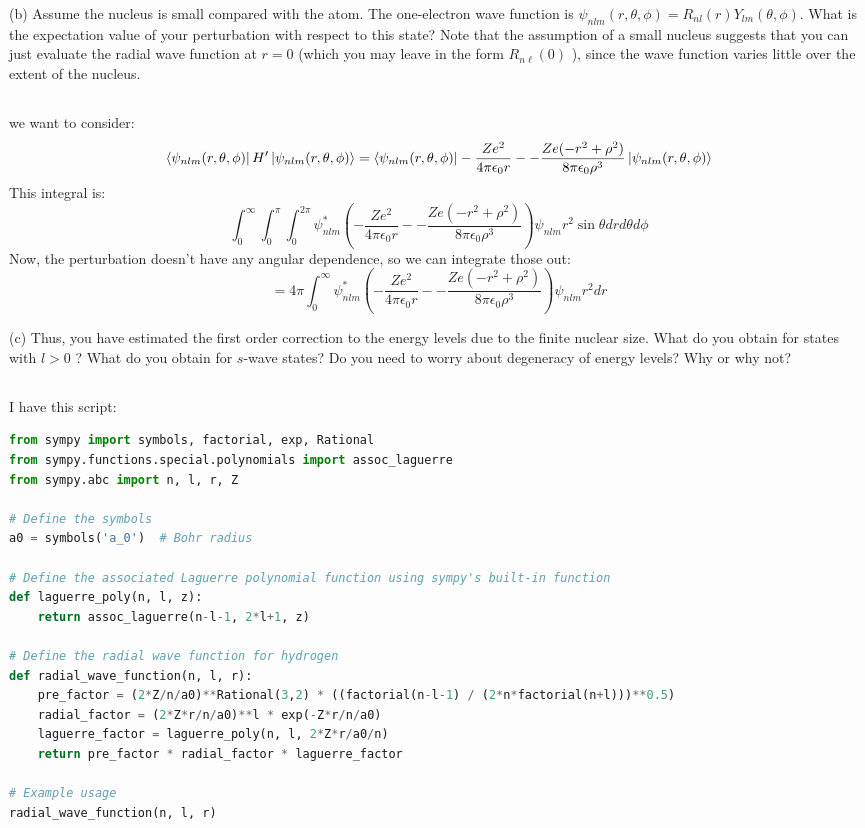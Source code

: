\documentclass[12pt]{article}
\begin{document}
(b) Assume the nucleus is small compared with the atom. The one-electron wave function is $\psi_{n l m}(r, \theta, \phi)=R_{n l}(r) Y_{l m}(\theta, \phi)$. What is the expectation value of your perturbation with respect to this state? Note that the assumption of a small nucleus suggests that you can just evaluate the radial wave function at $r=0$ (which you may leave in the form $R_{n \ell}(0)$ ), since the wave function varies little over the extent of the nucleus.
\subsection{}
we want to consider:
\begin{equation}
  \bra{\psi_{n l m}(r, \theta, \phi)}H'\ket{\psi_{n l m}(r, \theta, \phi)} = \bra{\psi_{n l m}(r, \theta, \phi)}-\frac{Ze^2}{4\pi\epsilon_0 r} - -\frac{Ze(-r^2 + \rho^2)}{8\pi\epsilon_0\rho^3}\ket{\psi_{n l m}(r, \theta, \phi)}
\end{equation}
This integral is:
\begin{equation}
  \int_{0}^{\infty} \int_{0}^{\pi} \int_{0}^{2 \pi} \psi_{n l m}^{*}(-\frac{Ze^2}{4\pi\epsilon_0 r} - -\frac{Ze(-r^2 + \rho^2)}{8\pi\epsilon_0\rho^3}) \psi_{n l m} r^{2} \sin \theta d r d \theta d \phi
\end{equation}
Now, the perturbation doesn't have any angular dependence, so we can integrate those out:
\begin{equation}
  = 4 \pi \int_{0}^{\infty} \psi_{n l m}^{*}(-\frac{Ze^2}{4\pi\epsilon_0 r} - -\frac{Ze(-r^2 + \rho^2)}{8\pi\epsilon_0\rho^3}) \psi_{n l m} r^{2} d r
\end{equation}

(c) Thus, you have estimated the first order correction to the energy levels due to the finite nuclear size. What do you obtain for states with $l>0$ ? What do you obtain for $s$-wave states? Do you need to worry about degeneracy of energy levels? Why or why not?
\subsection{}
I have this script:
\begin{lstlisting}[language=Python]
from sympy import symbols, factorial, exp, Rational
from sympy.functions.special.polynomials import assoc_laguerre
from sympy.abc import n, l, r, Z

# Define the symbols
a0 = symbols('a_0')  # Bohr radius

# Define the associated Laguerre polynomial function using sympy's built-in function
def laguerre_poly(n, l, z):
    return assoc_laguerre(n-l-1, 2*l+1, z)

# Define the radial wave function for hydrogen
def radial_wave_function(n, l, r):
    pre_factor = (2*Z/n/a0)**Rational(3,2) * ((factorial(n-l-1) / (2*n*factorial(n+l)))**0.5)
    radial_factor = (2*Z*r/n/a0)**l * exp(-Z*r/n/a0)
    laguerre_factor = laguerre_poly(n, l, 2*Z*r/a0/n)
    return pre_factor * radial_factor * laguerre_factor

# Example usage
radial_wave_function(n, l, r)

\end{lstlisting}
\end{document}

